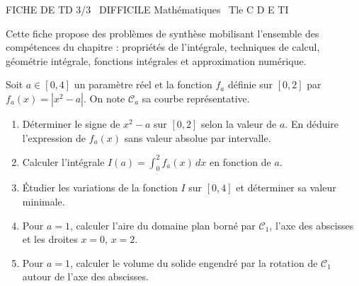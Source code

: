 \documentclass[11pt]{article}
\begin{document}
\begin{tcolorbox}[enhanced,colback=popink,colframe=popink,arc=10pt,boxrule=0pt,left=12pt,right=12pt,top=9pt,bottom=9pt]
{\color{white}\popxbold\small FICHE DE TD 3/3 \textbullet\ DIFFICILE \hfill Mathématiques \textbullet\ Tle C D E TI\par}
\end{tcolorbox}
\vspace{4pt}
Cette fiche propose des problèmes de synthèse mobilisant l'ensemble des compétences du chapitre : propriétés de l'intégrale, techniques de calcul, géométrie intégrale, fonctions intégrales et approximation numérique.

\begin{exercice}
Soit $a \in [0, 4]$ un paramètre réel et la fonction $f_a$ définie sur $[0, 2]$ par $f_a(x) = |x^2 - a|$. On note $\mathcal{C}_a$ sa courbe représentative.
\begin{enumerate}
    \item Déterminer le signe de $x^2 - a$ sur $[0, 2]$ selon la valeur de $a$. En déduire l'expression de $f_a(x)$ sans valeur absolue par intervalle.
    \item Calculer l'intégrale $I(a) = \int_0^2 f_a(x) \, dx$ en fonction de $a$.
    \item Étudier les variations de la fonction $I$ sur $[0, 4]$ et déterminer sa valeur minimale.
    \item Pour $a = 1$, calculer l'aire du domaine plan borné par $\mathcal{C}_1$, l'axe des abscisses et les droites $x=0$, $x=2$.
    \item Pour $a = 1$, calculer le volume du solide engendré par la rotation de $\mathcal{C}_1$ autour de l'axe des abscisses.
\end{enumerate}
\end{exercice}
\end{document}
